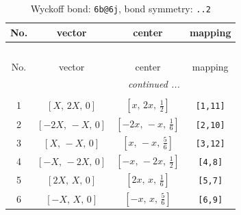 \documentclass[fleqn,8pt]{jsarticle}
\begin{document}
\begin{longtable}{cccc}
\caption{Wyckoff bond: {\tt 6b@6j}, bond symmetry: {\tt ..2}}
 \\
 \hline \hline
No. & vector & center & mapping \\ \hline \endfirsthead

\multicolumn{3}{l}{\tablename\ \thetable{}} \\
 \hline \hline
No. & vector & center & mapping \\ \hline \endhead

 \hline \hline
\multicolumn{3}{r}{\footnotesize\it continued ...} \\ \endfoot

 \hline \hline
\multicolumn{3}{r}{} \\ \endlastfoot

1 & $\left[ X,\, 2 X,\, 0 \right]$ & $\left[ x,\, 2 x,\, \frac{1}{2} \right]$ & {\tt [1,11]} \\ \hline
2 & $\left[ - 2 X,\, - X,\, 0 \right]$ & $\left[ - 2 x,\, - x,\, \frac{1}{6} \right]$ & {\tt [2,10]} \\ \hline
3 & $\left[ X,\, - X,\, 0 \right]$ & $\left[ x,\, - x,\, \frac{5}{6} \right]$ & {\tt [3,12]} \\ \hline
4 & $\left[ - X,\, - 2 X,\, 0 \right]$ & $\left[ - x,\, - 2 x,\, \frac{1}{2} \right]$ & {\tt [4,8]} \\ \hline
5 & $\left[ 2 X,\, X,\, 0 \right]$ & $\left[ 2 x,\, x,\, \frac{1}{6} \right]$ & {\tt [5,7]} \\ \hline
6 & $\left[ - X,\, X,\, 0 \right]$ & $\left[ - x,\, x,\, \frac{5}{6} \right]$ & {\tt [6,9]} \\
\end{longtable}
\renewcommand{\arraystretch}{1.2}
\end{document}
